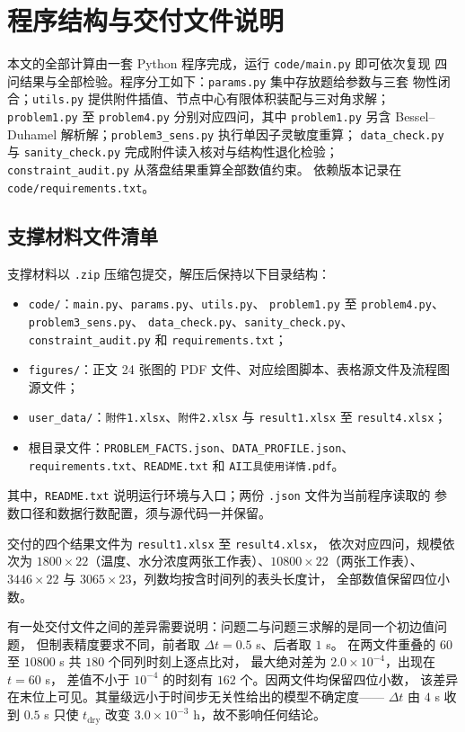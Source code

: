 \section{程序结构与交付文件说明}

本文的全部计算由一套 Python 程序完成，运行 \verb|code/main.py| 即可依次复现
四问结果与全部检验。程序分工如下：\verb|params.py| 集中存放题给参数与三套
物性闭合；\verb|utils.py| 提供附件插值、节点中心有限体积装配与三对角求解；
\verb|problem1.py| 至 \verb|problem4.py| 分别对应四问，其中 \verb|problem1.py|
另含 Bessel--Duhamel 解析解；\verb|problem3_sens.py| 执行单因子灵敏度重算；
\verb|data_check.py| 与 \verb|sanity_check.py| 完成附件读入核对与结构性退化检验；
\verb|constraint_audit.py| 从落盘结果重算全部数值约束。
依赖版本记录在 \verb|code/requirements.txt|。

\subsection*{支撑材料文件清单}
支撑材料以 \verb|.zip| 压缩包提交，解压后保持以下目录结构：
\begin{itemize}
  \item \verb|code/|：\verb|main.py|、\verb|params.py|、\verb|utils.py|、
  \verb|problem1.py| 至 \verb|problem4.py|、\verb|problem3_sens.py|、
  \verb|data_check.py|、\verb|sanity_check.py|、\verb|constraint_audit.py| 和
  \verb|requirements.txt|；
  \item \verb|figures/|：正文 24 张图的 PDF 文件、对应绘图脚本、表格源文件及流程图源文件；
  \item \verb|user_data/|：\verb|附件1.xlsx|、\verb|附件2.xlsx| 与
  \verb|result1.xlsx| 至 \verb|result4.xlsx|；
  \item 根目录文件：\verb|PROBLEM_FACTS.json|、\verb|DATA_PROFILE.json|、
  \verb|requirements.txt|、\verb|README.txt| 和 \verb|AI工具使用详情.pdf|。
\end{itemize}
其中，\verb|README.txt| 说明运行环境与入口；两份 \verb|.json| 文件为当前程序读取的
参数口径和数据行数配置，须与源代码一并保留。

交付的四个结果文件为 \verb|result1.xlsx| 至 \verb|result4.xlsx|，
依次对应四问，规模依次为
$1800\times22$（温度、水分浓度两张工作表）、$10800\times22$（两张工作表）、
$3446\times22$ 与 $3065\times23$，列数均按含时间列的表头长度计，
全部数值保留四位小数。

有一处交付文件之间的差异需要说明：问题二与问题三求解的是同一个初边值问题，
但制表精度要求不同，前者取 $\Delta t=0.5$ s、后者取 $1$ s。
在两文件重叠的 $60$ 至 $10800$ s 共 $180$ 个同列时刻上逐点比对，
最大绝对差为 $2.0\times10^{-4}$，出现在 $t=60$ s，
差值不小于 $10^{-4}$ 的时刻有 $162$ 个。因两文件均保留四位小数，
该差异在末位上可见。其量级远小于时间步无关性给出的模型不确定度——
$\Delta t$ 由 $4$ s 收到 $0.5$ s 只使 $t_{\mathrm{dry}}$ 改变
$3.0\times10^{-3}$ h，故不影响任何结论。

